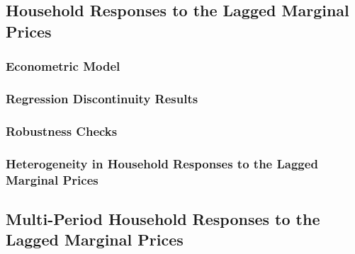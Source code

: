 \subsection{Household Responses to the Lagged Marginal Prices}
\label{C1-SubSection:Household-Responses-to-the-Lagged-Marginal-Prices}

\subsubsection{Econometric Model}
\label{C1-SubSubSection:Econometric-Model}



\subsubsection{Regression Discontinuity Results}
\label{C1-SubSubSection:Regression-Discontinuity-Results}



\subsubsection{Robustness Checks}
\label{C1-SubSubSection:Robustness-Checks}



\subsubsection{Heterogeneity in Household Responses to the Lagged Marginal Prices}
\label{C1-SubSubSection:Heterogeneity-in-Household-Response-to-the-Lagged-Marginal-Prices}




\subsection{Multi-Period Household Responses to the Lagged Marginal Prices}
\label{C1-SubSection:Multi-Period-Household-Responses-to-the-Lagged-Marginal-Prices}

